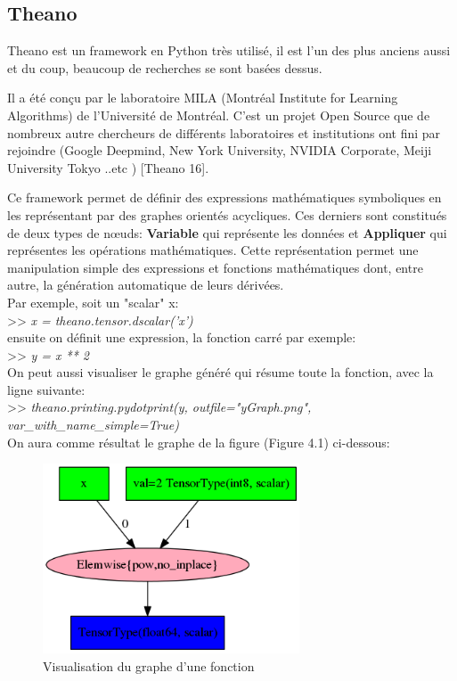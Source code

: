 \subsection{Theano}
	Theano est un framework en Python très utilisé, il est l'un des plus anciens aussi et du coup, beaucoup de recherches se sont basées dessus. 

	Il a été conçu par le laboratoire MILA (Montréal Institute for Learning Algorithms) de l’Université de Montréal. C'est un projet Open Source que de nombreux autre chercheurs de différents laboratoires et institutions ont fini par rejoindre (Google Deepmind, New  York  University, NVIDIA Corporate, Meiji  University Tokyo ..etc ) [Theano 16].

	Ce framework permet de définir des expressions mathématiques symboliques en les représentant par des graphes orientés acycliques. Ces derniers sont constitués de deux types de nœuds: \textbf{Variable} qui représente les données et \textbf{Appliquer} qui représentes les opérations mathématiques. Cette représentation permet une manipulation simple des expressions et fonctions mathématiques dont, entre autre, la génération automatique de leurs dérivées.\\

Par exemple, soit un "scalar" x: \\

>> \textit{x = theano.tensor.dscalar('x')}\\

ensuite on définit une expression, la fonction carré par exemple: \\

>> \textit{y = x ** 2}\\

	On peut aussi visualiser le graphe généré qui résume toute la fonction, avec la ligne suivante:\\

>> \textit{theano.printing.pydotprint(y, outfile="yGraph.png", var\_with\_name\_simple=True)}\\

On aura comme résultat le graphe de la figure (Figure 4.1) ci-dessous:

\begin{figure}[H]
	\centering
		\includegraphics[width=3in]{Figures/yGraph.png}
	\caption[TheanoGraph]{Visualisation du graphe d'une fonction}
	\label{fig:Electron}
\end{figure}

